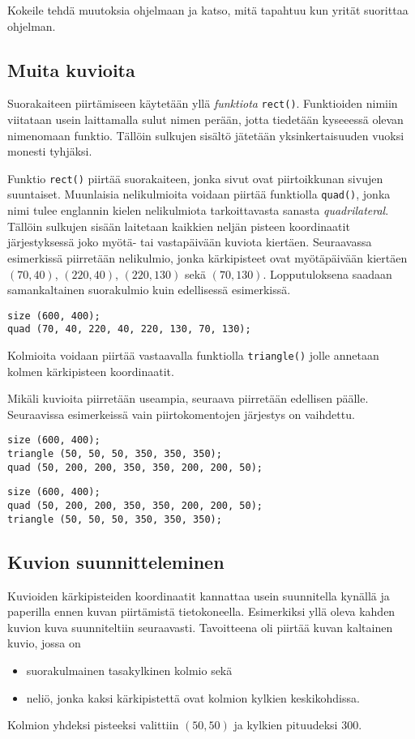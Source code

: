 \documentclass[11pt]{article}
\begin{document}
Kokeile tehdä muutoksia ohjelmaan ja katso, mitä tapahtuu kun yrität
suorittaa ohjelman.
\subsection*{Muita kuvioita}
\label{sec:org254e2e2}
Suorakaiteen piirtämiseen käytetään yllä \emph{funktiota}
\texttt{rect()}. Funktioiden nimiin viitataan usein laittamalla sulut
nimen perään, jotta tiedetään kyseeessä olevan nimenomaan
funktio. Tällöin sulkujen sisältö jätetään yksinkertaisuuden vuoksi
monesti tyhjäksi.

Funktio \texttt{rect()} piirtää suorakaiteen, jonka sivut ovat
piirtoikkunan sivujen suuntaiset. Muunlaisia nelikulmioita voidaan
piirtää funktiolla \texttt{quad()}, jonka nimi tulee englannin kielen
nelikulmiota tarkoittavasta sanasta \emph{quadrilateral}. Tällöin
sulkujen sisään laitetaan kaikkien neljän pisteen koordinaatit
järjestyksessä joko myötä- tai vastapäivään kuviota
kiertäen. Seuraavassa esimerkissä piirretään nelikulmio, jonka
kärkipisteet ovat myötäpäivään kiertäen \((70, 40)\), \((220, 40)\),
\((220, 130)\) sekä \((70, 130)\). Lopputuloksena saadaan
samankaltainen suorakulmio kuin edellisessä esimerkissä.

\begin{verbatim}
size (600, 400);
quad (70, 40, 220, 40, 220, 130, 70, 130);
\end{verbatim}

Kolmioita voidaan piirtää vastaavalla funktiolla \texttt{triangle()} jolle
annetaan kolmen kärkipisteen koordinaatit. 

Mikäli kuvioita piirretään useampia, seuraava piirretään edellisen
päälle. Seuraavissa esimerkeissä vain piirtokomentojen järjestys on
vaihdettu.

\begin{verbatim}
size (600, 400);
triangle (50, 50, 50, 350, 350, 350);
quad (50, 200, 200, 350, 350, 200, 200, 50);
\end{verbatim}

\begin{verbatim}
size (600, 400);
quad (50, 200, 200, 350, 350, 200, 200, 50);
triangle (50, 50, 50, 350, 350, 350);
\end{verbatim}
\subsection*{Kuvion suunnitteleminen}
\label{sec:orgbebab83}
Kuvioiden kärkipisteiden koordinaatit kannattaa usein suunnitella
kynällä ja paperilla ennen kuvan piirtämistä
tietokoneella. Esimerkiksi yllä oleva kahden kuvion kuva
suunniteltiin seuraavasti. Tavoitteena oli piirtää kuvan kaltainen
kuvio, jossa on 
\begin{itemize}
\item suorakulmainen tasakylkinen kolmio sekä
\item neliö, jonka kaksi kärkipistettä ovat kolmion kylkien
keskikohdissa.
\end{itemize}
Kolmion yhdeksi pisteeksi valittiin \((50, 50)\) ja kylkien
pituudeksi 300.
\end{document}
